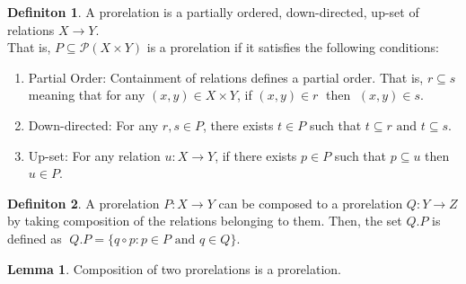 \documentclass[18pt,a4paper]{article}
\theoremstyle{definition}
\newtheorem{definition}{Definiton}[section]
\newtheorem{lemma}{Lemma}[definition]
\begin{document}
\begin{definition}%
	A prorelation is a partially ordered, down-directed, up-set of relations $X \to Y$.\\
	That is, $P \subseteq \mathcal{P}(X \times Y)$ is a prorelation if it satisfies the
	following conditions:
	\begin{enumerate}[label=(\roman*)]
		\item Partial Order: Containment of relations defines a partial order.
			That is, $r \subseteq s$  meaning that for any $(x,y) \in X \times Y$,
			if  $(x,y)\in r\;$ then $\;(x,y)\in s$.
		\item Down-directed: For any $r,s \in P$, there exists $t \in P $ such that
			$t\subseteq r \text{ and } t \subseteq s$.
		\item Up-set: For any relation $u:X\to Y$, if there exists $p \in P$ such that
			$p \subseteq u $ then $u \in P$.
	\end{enumerate}
\end{definition}
\begin{definition}%
	A prorelation $P:X \to Y$ can be composed to a prorelation $Q:Y \to Z$ by taking
	composition of the relations belonging to them. Then, the set $Q.P$ is defined as
	$\; Q.P=\{q \circ p : p \in P \text{ and } q \in Q  \}$.
\end{definition}
\begin{lemma}
	Composition of two prorelations is a prorelation.
\end{lemma}
\end{document}
